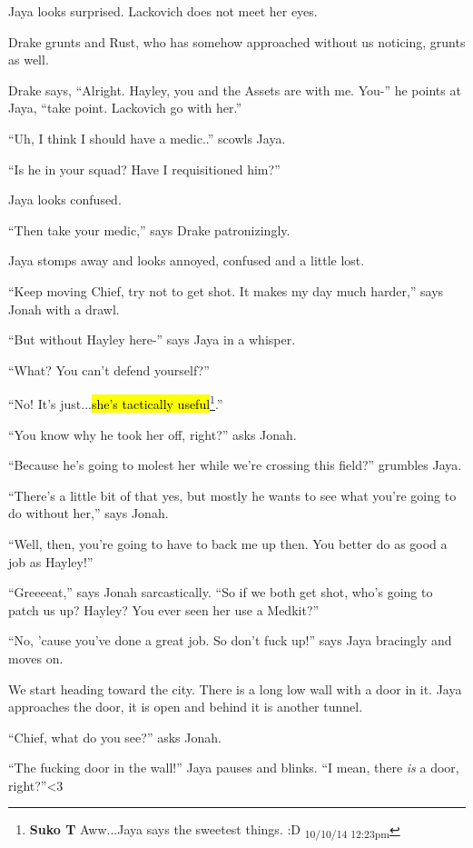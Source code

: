 Jaya looks surprised.  Lackovich does not meet her eyes.

Drake grunts and Rust, who has somehow approached without us noticing, grunts as well. 

Drake says, ``Alright.  Hayley, you and the Assets are with me.  You-'' he points at Jaya, ``take point.  Lackovich go with her.''

``Uh, I think I should have a medic..'' scowls Jaya.

``Is he in your squad?  Have I requisitioned him?''

Jaya looks confused.

``Then take your medic,'' says Drake patronizingly.

Jaya stomps away and looks annoyed, confused and a little lost.

``Keep moving Chief, try not to get shot.  It makes my day much harder,'' says Jonah with a drawl.

``But without Hayley here-'' says Jaya in a whisper.

``What?  You can't defend yourself?''

``No!  It's just...\hl{she's tactically useful}\footnote{\textbf{Suko T }Aww...Jaya says the sweetest things. :D \textsubscript{10/10/14 12:23pm}}.''

``You know why he took her off, right?'' asks Jonah.

``Because he's going to molest her while we're crossing this field?'' grumbles Jaya.

``There's a little bit of that yes, but mostly he wants to see what you're going to do without her,'' says Jonah.

``Well, then, you're going to have to back me up then.  You better do as good a job as Hayley!''

``Greeeeat,'' says Jonah sarcastically.  ``So if we both get shot, who's going to patch us up?  Hayley?  You ever seen her use a Medkit?''

``No, 'cause you've done a great job.  So don't fuck up!'' says Jaya bracingly and moves on.





We start heading toward the city.  There is a long low wall with a door in it.  Jaya approaches the door, it is open and behind it is another tunnel.

``Chief, what do you see?'' asks Jonah.

``The fucking door in the wall!'' Jaya pauses and blinks.  ``I mean, there \textit{is} a door, right?''\textless 3

